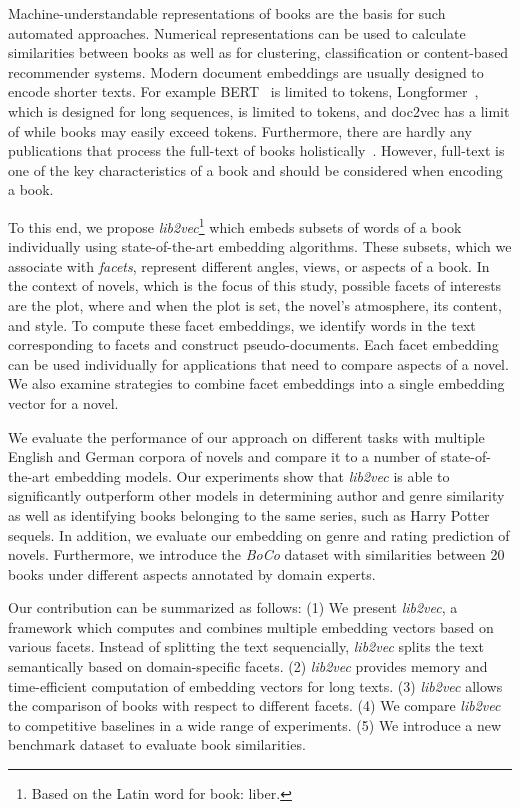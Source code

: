 \documentclass[11pt]{article}
\begin{document}
Machine-understandable representations of books are the basis for such automated approaches.
Numerical representations can be used to calculate similarities between books as well as for clustering, classification or content-based recommender systems.
Modern document embeddings are usually designed to encode shorter texts.
For example BERT~\citep{devlin_bert_2019} is limited to  tokens, Longformer~\citep{beltagy_longformer_2020}, which is designed for long sequences, is limited to  tokens, and doc2vec has a limit of  while books may easily exceed  tokens.
Furthermore, there are hardly any publications that process the full-text of books holistically~\citep{alharthi_study_2019}.
However, full-text is one of the key characteristics of a book and should be considered when encoding a book.

To this end, we propose \emph{lib2vec}\footnote{Based on the Latin word for book: liber.} which embeds subsets of words of a book individually using state-of-the-art embedding algorithms.
These subsets, which we associate with \emph{facets}, represent different angles, views, or aspects of a book.
In the context of novels, which is the focus of this study, possible facets of interests are the plot, where and when the plot is set, the novel's atmosphere, its content, and style.
To compute these facet embeddings, we identify words in the text corresponding to facets and construct pseudo-documents.
Each facet embedding can be used individually for applications that need to compare aspects of a novel.
We also examine strategies to combine facet embeddings into a single embedding vector for a novel.

We evaluate the performance of our approach on different tasks with multiple English and German corpora of novels and compare it to a number of state-of-the-art embedding models.
Our experiments show that \emph{lib2vec} is able to significantly outperform other models in determining author and genre similarity as well as identifying books belonging to the same series, such as Harry Potter sequels.
In addition, we evaluate our embedding on genre and rating prediction of novels.
Furthermore, we introduce the \emph{BoCo} dataset with similarities between 20 books under different aspects annotated by  domain experts.

Our contribution can be summarized as follows:
(1) We present \emph{lib2vec}, a framework which computes and combines multiple embedding vectors based on various facets. Instead of splitting the text sequencially, \emph{lib2vec} splits the text semantically based on domain-specific facets.
(2) \emph{lib2vec} provides memory and time-efficient computation of embedding vectors for long texts.
(3) \emph{lib2vec} allows the comparison of books with respect to different facets.
(4) We compare \emph{lib2vec} to competitive baselines in a wide range of experiments.
(5) We introduce a new benchmark dataset to evaluate book similarities.
\end{document}
